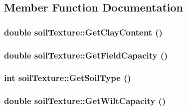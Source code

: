 \subsection{Member Function Documentation}
\hypertarget{classsoil_texture_a859c98627b177ad8cd5248712c479ffd}{
\subsubsection[{GetClayContent}]{\setlength{\rightskip}{0pt plus 5cm}double soilTexture::GetClayContent ()}}
\label{classsoil_texture_a859c98627b177ad8cd5248712c479ffd}
\hypertarget{classsoil_texture_a01e404ea4179af3bd610ed14611a5441}{
\subsubsection[{GetFieldCapacity}]{\setlength{\rightskip}{0pt plus 5cm}double soilTexture::GetFieldCapacity ()}}
\label{classsoil_texture_a01e404ea4179af3bd610ed14611a5441}
\hypertarget{classsoil_texture_a68fb72c12e27351d8dd6722de8987abc}{
\subsubsection[{GetSoilType}]{\setlength{\rightskip}{0pt plus 5cm}int soilTexture::GetSoilType ()}}
\label{classsoil_texture_a68fb72c12e27351d8dd6722de8987abc}
\hypertarget{classsoil_texture_a226ec43e70dcd378705033c54aa853c2}{
\subsubsection[{GetWiltCapacity}]{\setlength{\rightskip}{0pt plus 5cm}double soilTexture::GetWiltCapacity ()}}
\label{classsoil_texture_a226ec43e70dcd378705033c54aa853c2}


